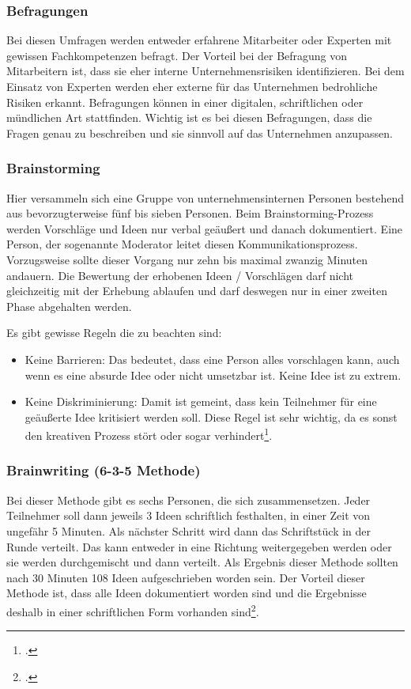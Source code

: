 \subsubsection{Befragungen}
Bei diesen Umfragen werden entweder erfahrene Mitarbeiter oder Experten mit gewissen Fachkompetenzen befragt. Der Vorteil bei der Befragung von Mitarbeitern ist, dass sie eher interne Unternehmensrisiken identifizieren. Bei dem Einsatz von Experten werden eher externe für das Unternehmen bedrohliche Risiken erkannt. Befragungen können in einer digitalen, schriftlichen oder mündlichen Art stattfinden.
Wichtig ist es bei diesen Befragungen, dass die Fragen genau zu beschreiben und sie sinnvoll auf das Unternehmen anzupassen.

\subsubsection{Brainstorming}
Hier versammeln sich eine Gruppe von unternehmensinternen Personen bestehend aus bevorzugterweise fünf bis sieben Personen. 
Beim Brainstorming-Prozess werden Vorschläge und Ideen nur verbal geäußert und danach dokumentiert. Eine Person, der sogenannte Moderator leitet diesen Kommunikationsprozess. Vorzugsweise sollte dieser Vorgang nur zehn bis maximal zwanzig Minuten andauern.
Die Bewertung der erhobenen Ideen / Vorschlägen darf nicht gleichzeitig mit der Erhebung ablaufen und darf deswegen nur in einer zweiten Phase abgehalten werden. 

Es gibt gewisse Regeln die zu beachten sind:
\begin{itemize}
	\item Keine Barrieren: Das bedeutet, dass eine Person alles vorschlagen kann, auch wenn es eine absurde Idee oder nicht umsetzbar ist. Keine Idee ist zu extrem.
	\item Keine Diskriminierung: Damit ist gemeint, dass kein Teilnehmer für eine geäußerte Idee kritisiert werden soll. Diese Regel ist sehr wichtig, da es sonst den kreativen Prozess stört oder sogar verhindert\footcite{risikomanagement-diplomarbeit-methoden}.
\end{itemize}

\subsubsection{Brainwriting (6-3-5 Methode)}
Bei dieser Methode gibt es sechs Personen, die sich zusammensetzen. Jeder Teilnehmer soll dann jeweils 3 Ideen schriftlich festhalten, in einer Zeit von ungefähr 5 Minuten.
Als nächster Schritt wird dann das Schriftstück in der Runde verteilt. Das kann entweder in eine Richtung weitergegeben werden oder sie werden durchgemischt und dann verteilt. 
Als Ergebnis dieser Methode sollten nach 30 Minuten 108 Ideen aufgeschrieben worden sein.
Der Vorteil dieser Methode ist, dass alle Ideen dokumentiert worden sind und die Ergebnisse deshalb in einer schriftlichen Form vorhanden sind\footcite{risikomanagement-diplomarbeit-methoden}.

